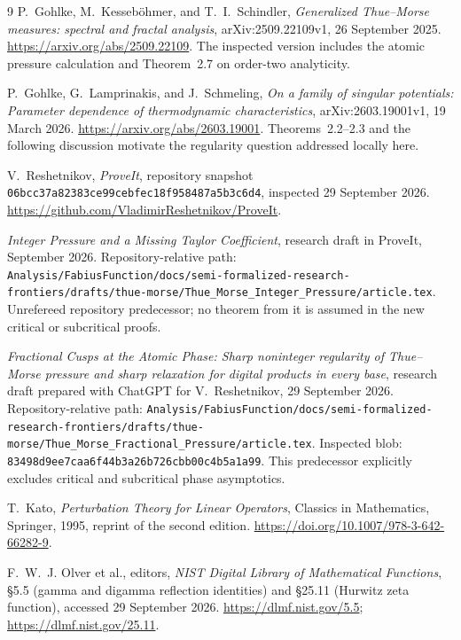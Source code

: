 \documentclass[11pt,a4paper]{article}
\numberwithin{equation}{section}
\theoremstyle{definition}
\theoremstyle{remark}
\begin{document}
\clearpage
{}
\begin{thebibliography}{9}
P.~Gohlke, M.~Kesseb\"ohmer, and T.~I.~Schindler,
\emph{Generalized Thue--Morse measures: spectral and fractal analysis},
arXiv:2509.22109v1, 26 September 2025.
\url{https://arxiv.org/abs/2509.22109}.
The inspected version includes the atomic pressure calculation and
Theorem~2.7 on order-two analyticity.

P.~Gohlke, G.~Lamprinakis, and J.~Schmeling,
\emph{On a family of singular potentials: Parameter dependence of
thermodynamic characteristics}, arXiv:2603.19001v1, 19 March 2026.
\url{https://arxiv.org/abs/2603.19001}.
Theorems~2.2--2.3 and the following discussion motivate the regularity
question addressed locally here.

V.~Reshetnikov, \emph{ProveIt}, repository snapshot
\nolinkurl{06bcc37a82383ce99cebfec18f958487a5b3c6d4},
inspected 29 September 2026.
\url{https://github.com/VladimirReshetnikov/ProveIt}.

\emph{Integer Pressure and a Missing Taylor Coefficient},
research draft in ProveIt, September 2026.
Repository-relative path:
\nolinkurl{Analysis/FabiusFunction/docs/semi-formalized-research-frontiers/drafts/thue-morse/Thue_Morse_Integer_Pressure/article.tex}.
Unrefereed repository predecessor; no theorem from it is assumed in the
new critical or subcritical proofs.

\emph{Fractional Cusps at the Atomic Phase: Sharp noninteger regularity
of Thue--Morse pressure and sharp relaxation for digital products in
every base}, research draft prepared with ChatGPT for V.~Reshetnikov,
29 September 2026.
Repository-relative path:
\nolinkurl{Analysis/FabiusFunction/docs/semi-formalized-research-frontiers/drafts/thue-morse/Thue_Morse_Fractional_Pressure/article.tex}.
Inspected blob:
\nolinkurl{83498d9ee7caa6f44b3a26b726cbb00c4b5a1a99}.
This predecessor explicitly excludes critical and subcritical phase
asymptotics.

T.~Kato, \emph{Perturbation Theory for Linear Operators},
Classics in Mathematics, Springer, 1995, reprint of the second edition.
\url{https://doi.org/10.1007/978-3-642-66282-9}.

F.~W.~J. Olver et al., editors,
\emph{NIST Digital Library of Mathematical Functions},
\S5.5 (gamma and digamma reflection identities) and
\S25.11 (Hurwitz zeta function), accessed 29 September 2026.
\url{https://dlmf.nist.gov/5.5};
\url{https://dlmf.nist.gov/25.11}.
\end{thebibliography}
\end{document}
